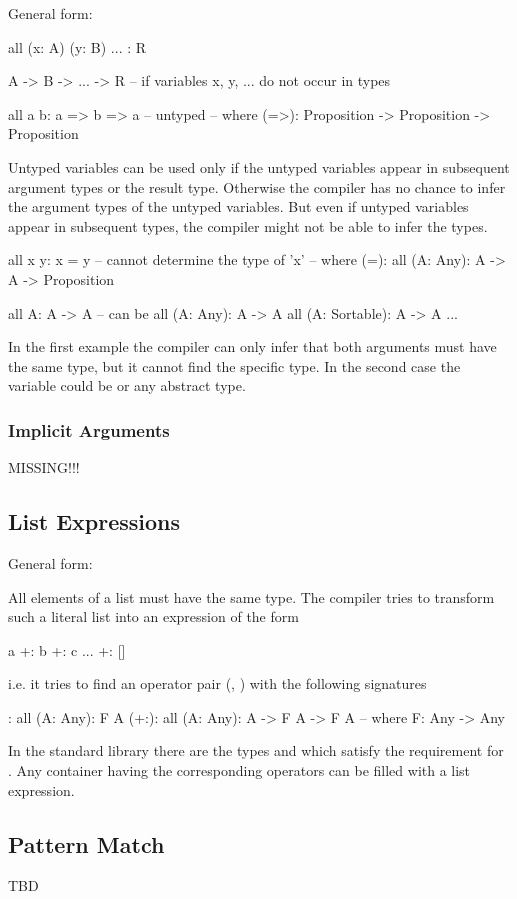 General form:
%
\begin{alba}
    all (x: A) (y: B) ... : R

    A -> B -> ... -> R      -- if variables x, y, ... do not occur in types

    all a b: a => b => a    -- untyped
    -- where
    (=>): Proposition -> Proposition -> Proposition
\end{alba}

Untyped variables can be used only if the untyped variables appear in subsequent
argument types or the result type. Otherwise the compiler has no chance to infer
the argument types of the untyped variables. But even if untyped variables
appear in subsequent types, the compiler might not be able to infer the types.

\begin{alba}
    all x y: x = y              -- cannot determine the type of 'x'
    -- where
    (=): all (A: Any): A -> A -> Proposition

    all A: A -> A
    -- can be
    all (A: Any): A -> A
    all (A: Sortable): A -> A
    ...
\end{alba}
%
In the first example the compiler can only infer that both arguments must have
the same type, but it cannot find the specific type. In the second case the
variable  could be  or any abstract type.


\subsubsection{Implicit Arguments}

MISSING!!!









\vskip 5mm
\subsection{List Expressions}

General form:
%
\begin{alba}
    [a, b, c, ... ]
\end{alba}

All elements of a list must have the same type. The compiler tries to transform
such a literal list into an expression of the form
%
\begin{alba}
    a +: b +: c ... +: []
\end{alba}
%
i.e. it tries to find an operator pair (\code{[]}, \code{(+:)}) with the
following signatures
%
\begin{alba}
    []:   all (A: Any): F A
    (+:): all (A: Any): A -> F A -> F A
    -- where
    F: Any -> Any
\end{alba}
%
In the standard library there are the types  and  which
satisfy the requirement for . Any container having the corresponding
operators can be filled with a list expression.






\vskip 5mm
\subsection{Pattern Match}

TBD
